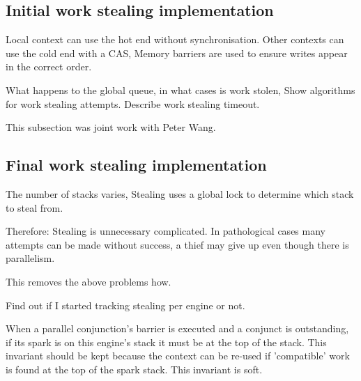 
\subsection{Initial work stealing implementation}



Local context can use the hot end without synchronisation.
Other contexts can use the cold end with a CAS,
Memory barriers are used to ensure writes appear in the correct order.

What happens to the global queue,
in what cases is work stolen,
Show algorithms for work stealing attempts.
Describe work stealing timeout.


This subsection was joint work with Peter Wang.

\subsection{Final work stealing implementation}

The number of stacks varies,
Stealing uses a global lock to determine which stack to steal from.

Therefore:
Stealing is unnecessary complicated.
In pathological cases many attempts can be made without success,
a thief may give up even though there is parallelism.

This removes the above problems how.

Find out if I started tracking stealing per engine or not.

When a parallel conjunction's barrier is executed and a conjunct is
outstanding, if its spark is on this engine's stack it must be at the top of
the stack.
This invariant should be kept because the context can be re-used if
'compatible' work is found at the top of the spark stack.
This invariant is soft.

